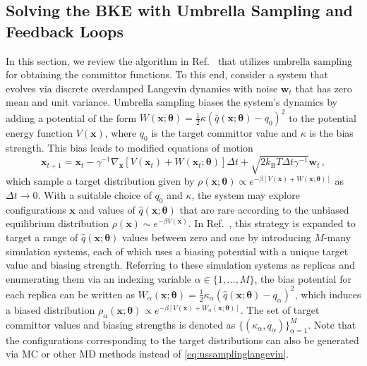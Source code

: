 \documentclass{article}
\numberwithin{equation}{section}
\def\*#1{\mathbf{#1}}
\theoremstyle{definition}
\theoremstyle{remark}
\def\thetab{\boldsymbol{\theta}}
\begin{document}
\subsection{Solving the BKE with Umbrella Sampling and Feedback Loops} \label{sec:base}

In this section, we review the algorithm in Ref.~\cite{rotskoff2020learning} that utilizes umbrella sampling for obtaining the committor functions. 
To this end, consider a system that evolves via discrete overdamped Langevin dynamics with noise $ \* w_t $ that has zero mean and unit variance.
Umbrella sampling biases the system's dynamics by adding a potential of the form $ W (\* x; \thetab) = \frac{1}{2} \kappa ( \hat{q}(\* x; \thetab)-q_0)^2 $ to the potential energy function $ V ( \* x ) $, where $ q_0 $ is the target committor value and $ \kappa $ is the bias strength.
This bias leads to modified equations of motion
\begin{equation}
\* x_{t+1} = \* x_t-\gamma^{-1} \nabla_{\* x}\left[ V(\* x_t) + W (\* x_t; \thetab) \right]\Delta t + \sqrt{2 k_\mathrm{B} T \Delta t \gamma^{-1}} \* w_t \,, \label{eq:ussamplinglangevin}
\end{equation}
which sample a target distribution given by $\rho (\* x; \thetab) \propto e^{-\beta[V(\* x)+W (\* x; \thetab)]}$ as $\Delta t  \to 0$. With a suitable choice of $q_0$ and $\kappa$, the system may explore configurations $ \* x $ and values of $ \hat{q}( \* x ; \thetab ) $ that are rare according to the unbiased equilibrium distribution $\rho(\* x) \sim e^{-\beta V(\* x)}$.
In Ref.~\cite{rotskoff2020learning}, this strategy is expanded to target a range of $ \hat{q}(\* x; \thetab) $ values between zero and one by introducing $M$-many simulation systems, each of which uses a biasing potential with a unique target value and biasing strength.
Referring to these simulation systems as replicas and enumerating them via an indexing variable $ \alpha \in \{ 1,\ldots, M\}$,
the bias potential for each replica can be written as $ W_\alpha (\* x; \thetab)  = \frac{1}{2}\kappa_\alpha ( \hat{q}(\* x; \thetab)-q_\alpha)^2 $, which induces a biased distribution  $\rho_\alpha(\* x; \thetab) \propto e^{-\beta[V(\* x)+W_\alpha (\* x; \thetab)]}$. 
The set of target committor values and biasing strengths is denoted as $\{(\kappa_\alpha, q_\alpha )\}_{\alpha=1}^M$. 
Note that the configurations corresponding to the target distributions can also be generated via MC or other MD methods instead of \cref{eq:ussamplinglangevin}. 
\end{document}

